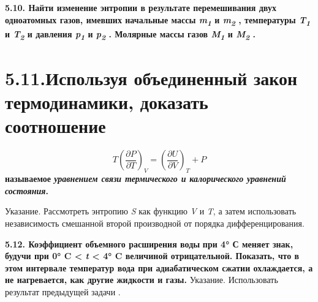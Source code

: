 \textbf{5.10. Найти изменение энтропии в результате перемешивания двух
одноатомных газов, имевших начальные массы \emph{m\textsubscript{1}} и
\emph{m\textsubscript{2}} , температуры \emph{T\textsubscript{1}} и
\emph{T\textsubscript{2}} и давления \emph{p\textsubscript{1}} и
\emph{p\textsubscript{2}} . Молярные массы газов
\emph{M\textsubscript{1}} и \emph{M\textsubscript{2}} .}

\section{5.11.Используя объединенный закон термодинамики, доказать
соотношение} \label{ThermKalEq}
\begin{equation}
  T \left ( \frac{\partial P}{\partial T}\right )_V = \left ( \frac{\partial U}{\partial V}\right )_T + P
\end{equation}
\textbf{называемое \emph{уравнением связи термического и калорического
уравнений состояния}.}

Указание. Рассмотреть энтропию \emph{S} как функцию \emph{V} и \emph{T},
а затем использовать независимость смешанной второй производной от
порядка дифференцирования.

\textbf{5.12. Коэффициент объемного расширения воды}
\textbf{при 4° С меняет знак, будучи при 0° C \textless{} \emph{t} \textless{} 4° C величиной
отрицательной. Показать, что в этом интервале температур вода при
адиабатическом сжатии охлаждается, а не нагревается, как другие жидкости
и газы.} Указание. Использовать результат предыдущей задачи .
